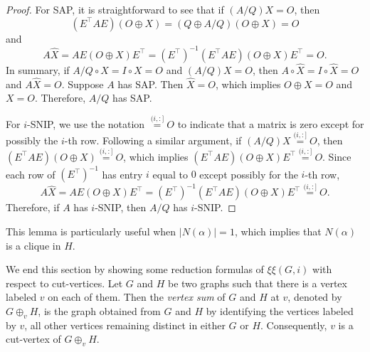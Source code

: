 \documentclass{article}
\theoremstyle{definition}
\newcommand{\trans}{^\top}
\newcommand{\excise}{\xi\xi}
\begin{document}
\begin{proof}
For SAP, it is straightforward to see that if $(A/Q)X = O$, then 
\[
    (E\trans AE)(O\oplus X) = (Q\oplus A/Q)(O\oplus X) = O
\]
and
\[
    A\widehat{X} = AE(O\oplus X)E\trans = (E\trans)^{-1}(E\trans AE)(O\oplus X)E\trans = O.
\]
In summary, if $A/Q\circ X = I\circ X = O$ and $(A/Q)X = O$, then $A\circ\widehat{X} = I\circ\widehat{X} = O$ and $A\widehat{X} = O$.  Suppose $A$ has SAP.  Then $\widehat{X} = O$, which implies $O\oplus X = O$ and $X = O$.  Therefore, $A/Q$ has SAP.  

For $i$-SNIP, we use the notation $\overset{(i,:]}{=} O$ to indicate that a matrix is zero except for possibly the $i$-th row.  Following a similar argument, if $(A/Q) X \overset{(i,:]}{=} O$, then $(E\trans AE)(O\oplus X) \overset{(i,:]}{=} O$, which implies $(E\trans AE)(O\oplus X)E\trans \overset{(i,:]}{=} O$.  Since each row of $(E\trans)^{-1}$ has entry $i$ equal to $0$ except possibly for the $i$-th row,
\[
    A\widehat{X} = AE(O\oplus X)E\trans = (E\trans)^{-1}(E\trans AE)(O\oplus X)E\trans \overset{(i,:]}{=} O.
\]
Therefore, if $A$ has $i$-SNIP, then $A/Q$ has $i$-SNIP.  
\end{proof}

This lemma is particularly useful when $|N(\alpha)| = 1$, which implies that $N(\alpha)$ is a clique in $H$.  

We end this section by showing some reduction formulas of $\excise(G, i)$ with respect to cut-vertices.
Let $G$ and $H$ be two graphs such that there is a vertex labeled $v$ on each of them.  Then the \emph{vertex sum} of $G$ and $H$ at $v$, denoted by $G\oplus_v H$, is the graph obtained from $G$ and $H$ by identifying the vertices labeled by $v$, all other vertices remaining distinct in either $G$ or $H$.
Consequently, $v$ is a cut-vertex of $G\oplus_v H$.
\end{document}
